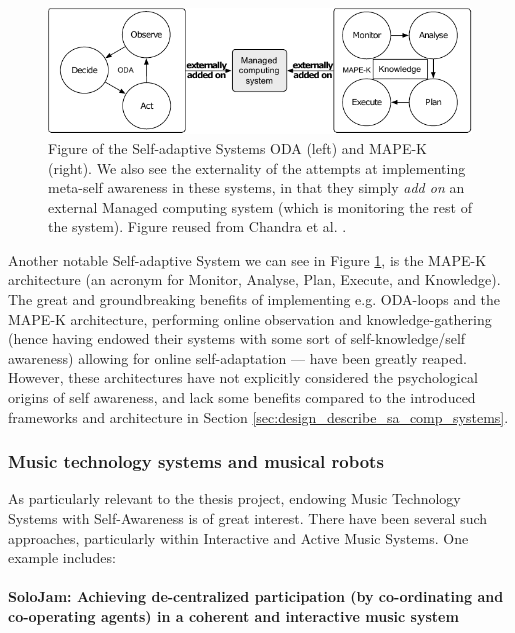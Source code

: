 		\begin{figure}[ht]
		\centering
		\includegraphics[width=\columnwidth]{Assets/DocSegments/Chapters/Background/Figures/Schema/oda_mapek.pdf}
		\caption[Previous and prevalent computational self adaptive agent frameworks.]{Figure of the Self-adaptive Systems ODA (left) and MAPE-K (right). We also see the externality of the attempts at implementing meta-self awareness in these systems, in that they simply \textit{add on} an external Managed computing system (which is monitoring the rest of the system). Figure reused from Chandra et al. \cite{sacs16_ch4}.}
		\label{fig:oda_mapek}
		\end{figure}

		Another notable Self-adaptive System we can see in Figure \ref{fig:oda_mapek}, is the MAPE-K architecture (an acronym for Monitor, Analyse, Plan, Execute, and Knowledge). The great and groundbreaking benefits of implementing e.g. ODA-loops and the MAPE-K architecture, performing online observation and knowledge-gathering (hence having endowed their systems with some sort of self-knowledge/self awareness) allowing for online self-adaptation — have been greatly reaped. However, these architectures have not explicitly considered the psychological origins of self awareness, and lack some benefits compared to the introduced frameworks and architecture in Section \ref{sec:design_describe_sa_comp_systems}.
	
	
		\subsubsection{Music technology systems and musical robots}
		\label{music_tech_robots}

		As particularly relevant to the thesis project, endowing Music Technology Systems with Self-Awareness is of great interest. There have been several such approaches, particularly within Interactive and Active Music Systems. One example includes:

			\paragraph{SoloJam: Achieving de-centralized participation (by co-ordinating and co-operating agents) in a coherent and interactive music system \nl}


